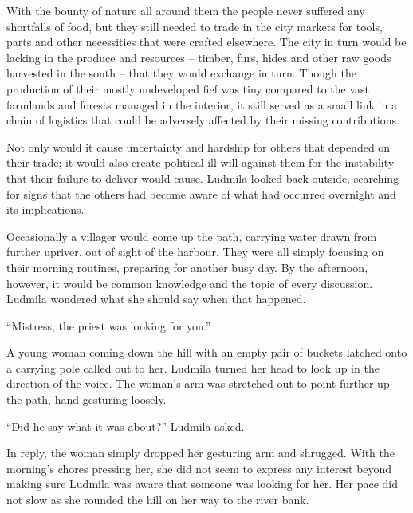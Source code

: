  

With the bounty of nature all around them the people never suffered any shortfalls of food, but they still needed to trade in the city markets for tools, parts and other necessities that were crafted elsewhere. The city in turn would be lacking in the produce and resources – timber, furs, hides and other raw goods harvested in the south – that they would exchange in turn. Though the production of their mostly undeveloped fief was tiny compared to the vast farmlands and forests managed in the interior, it still served as a small link in a chain of logistics that could be adversely affected by their missing contributions.

 

Not only would it cause uncertainty and hardship for others that depended on their trade; it would also create political ill-will against them for the instability that their failure to deliver would cause. Ludmila looked back outside, searching for signs that the others had become aware of what had occurred overnight and its implications.

 

Occasionally a villager would come up the path, carrying water drawn from further upriver, out of sight of the harbour. They were all simply focusing on their morning routines, preparing for another busy day. By the afternoon, however, it would be common knowledge and the topic of every discussion. Ludmila wondered what she should say when that happened.

 

“Mistress, the priest was looking for you.”

 

A young woman coming down the hill with an empty pair of buckets latched onto a carrying pole called out to her. Ludmila turned her head to look up in the direction of the voice. The woman's arm was stretched out to point further up the path, hand gesturing loosely.

 

“Did he say what it was about?” Ludmila asked.

 

In reply, the woman simply dropped her gesturing arm and shrugged. With the morning’s chores pressing her, she did not seem to express any interest beyond making sure Ludmila was aware that someone was looking for her. Her pace did not slow as she rounded the hill on her way to the river bank.

 

